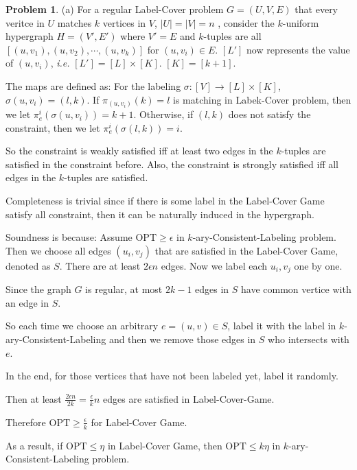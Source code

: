 \documentclass[a4paper]{article}
\theoremstyle{definition}
\newtheorem{problem}{Problem}
\theoremstyle{plain}
\newcommand{\<}{\left<}
\renewcommand{\>}{\right>}
\newcommand{\OPT}{\mathrm{OPT}}
\numberwithin{equation}{problem}
\newcommand{\ie}{ \textit{ i.e. } }
\begin{document}
\begin{problem}
    (a) For a regular Label-Cover problem  $ G=(U,V,E) $ that every veritce in  $ U $ matches  $ k $ vertices in  $ V $,  $ |U|=|V|=n $ , consider the  $ k $-uniform hypergraph  $ H=(V',E') $ where  $ V'=E $ and  $ k $-tuples are all  $ [(u,v_1),(u,v_2),\cdots,(u,v_k)] $ for  $  (u,v_i)\in E   $.  $ [L'] $ now represents the value of $ (u,v_i) $, \ie    $ [L']=[L]\times [K] $.  $ [K]=[k+1] $. 
    
    The maps are defined as: For the labeling  $ \sigma:[V]\rightarrow[L]\times [K] $,  $ \sigma(u,v_i)=(l,k) $. If  $ \pi_{(u,v_i)}(k)=l $ is matching in Labek-Cover problem, then we let  $ \pi_e^i(\sigma(u,v_i))=k+1 $. Otherwise, if  $ (l,k) $ does not satisfy the constraint, then we let  $ \pi_e^i(\sigma(l,k))=i $.
    
    So the constraint is weakly satisfied iff at least two edges in the  $ k $-tuples are satisfied in the constraint before. Also, the constraint is strongly satisfied iff all edges in the  $ k $-tuples are satisfied.
    
    Completeness is trivial since if there is some label in the Label-Cover Game satisfy all constraint, then it can be naturally induced in the hypergraph.

    Soundness is because: Assume  $ \OPT \geq \epsilon $ in  $ k $-ary-Consistent-Labeling problem. Then we choose all edges  $ (u_i,v_j) $ that are satisfied in  the Label-Cover Game, denoted as  $ S $. There are at least  $ 2\epsilon n $ edges. Now we label each  $ u_i,v_j $ one by one.

    Since the graph  $ G $ is regular, at most  $ 2k-1 $   edges in  $ S $ have common vertice with an edge in  $ S $.
    
    So each time we choose an arbitrary  $ e=(u,v)\in S $, label it with the label in  $ k $-ary-Consistent-Labeling and then we remove those edges in  $ S $ who intersects with  $ e $.
    
    In the end, for those vertices that have not been labeled yet, label it randomly.

    Then at least  $ \frac{2\epsilon n}{2k}=\frac{\epsilon }{k}n $ edges are satisfied in Label-Cover-Game.
    
    Therefore  $ \OPT \geq \frac{\epsilon}{k} $ for Label-Cover Game.
    
    As a result, if  $ \OPT \leq \eta $ in Label-Cover Game, then  $ \OPT \leq k\eta $ in  $ k $-ary-Consistent-Labeling problem.
    

\end{problem}
\end{document}
